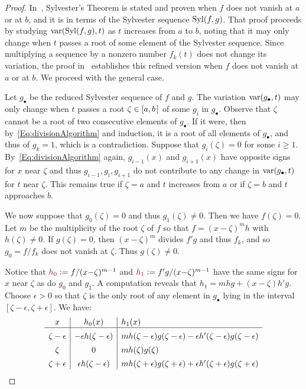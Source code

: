 \documentclass[12pt]{amsart}
\theoremstyle{definition}
\DeclareMathOperator{\var}{{\rm var}}
\DeclareMathOperator{\Syl}{{\rm Syl}}
\newcommand{\defcolor}[1]{{\color{TAMU}#1}}
\begin{document}
\begin{proof}
  In~\cite[Thm.\ 2.55]{BPR}, Sylvester's Theorem is stated and proven 
  when $f$ does not vanish at $a$ or at $b$, and it is in terms of the Sylvester sequence $\Syl(f,g)$.
  That proof proceeds by studying $\var(\Syl(f,g), t)$ as $t$ increases from $a$ to $b$, noting that it may only
  change when $t$ passes a root of some element of the Sylvester sequence.
  Since multiplying a sequence by a nonzero number $f_k(t)$ does not change its variation, the proof in~\cite{BPR}
  establishes this refined  version when $f$ does not vanish at $a$ or at $b$.
  We proceed with the general case.

  Let $g_\bullet$ be the reduced Sylvester sequence of $f$ and $g$.
  The variation $\var(g_\bullet,t)$ may only change when $t$ passes a root $\zeta\in[a,b\hspace{.05cm}]$ of some $g_i$ in
  $g_\bullet$. 
  Observe that $\zeta$ cannot be a root of two consecutive elements of $g_\bullet$.
  If it were, then by~\eqref{Eq:divisionAlgorithm} and induction, it is a root of all elements of $g_\bullet$, and thus of
  $g_k=1$, which is a contradiction.
  Suppose that $g_i(\zeta)=0$ for some $i\geq 1$.
  By~\eqref{Eq:divisionAlgorithm} again, $g_{i-1}(x)$ and $g_{i+1}(x)$ have opposite signs for $x$ near $\zeta$ and thus
  $g_{i-1},g_i,g_{i+1}$ do not contribute to any change in $\var(g_\bullet,t)$ for $t$ near $\zeta$.
  This remains true if $\zeta=a$ and $t$ increases from $a$ or if $\zeta=b$ and $t$ approaches $b$.

  We now suppose that $g_0(\zeta)=0$ and thus $g_1(\zeta)\neq 0$.
  Then we have $f(\zeta)=0$.
  Let $m$ be the multiplicity of the root $\zeta$ of $f$ so that $f=(x{-}\zeta)^m h$ with $h(\zeta)\neq 0$.
  If $g(\zeta)=0$, then $(x{-}\zeta)^m$ divides $f'g$ and thus $f_k$, and so $g_0=f/f_k$ does not vanish at $\zeta$.
  Thus $g(\zeta)\neq 0$.

  Notice that $\defcolor{h_0}\vcentcolon=f/(x{-}\zeta)^{m-1}$ and $\defcolor{h_1}\vcentcolon=f'g/(x{-}\zeta)^{m-1}$ have the same signs for
  $x$ near $\zeta$ as do $g_0$ and $g_1$.
  A computation reveals that $h_1=mhg+(x{-}\zeta)h'g$.
 Choose $\epsilon>0$ so that $\zeta$ is the only root of any element in $g_\bullet$ lying in the interval
 $[\zeta-\epsilon,\zeta+\epsilon]$.
 We have:
 \[
 \begin{array}{c|c|l}
   x & h_0(x) & h_1(x)\\\hline
   \zeta-\epsilon & -\epsilon h(\zeta-\epsilon)  &
        mh(\zeta-\epsilon)g(\zeta-\epsilon) - \epsilon h'(\zeta-\epsilon)g(\zeta-\epsilon)  \rule{0pt}{13pt}\\
   \zeta     &     0    &   mh(\zeta)g(\zeta)  \rule{0pt}{13pt}\\
   \zeta+\epsilon & \epsilon h(\zeta-\epsilon)  &
        mh(\zeta+\epsilon)g(\zeta+\epsilon) + \epsilon h'(\zeta+\epsilon)g(\zeta+\epsilon)  \rule{0pt}{13pt}
 \end{array}
 \]
 

\end{proof}
\end{document}
